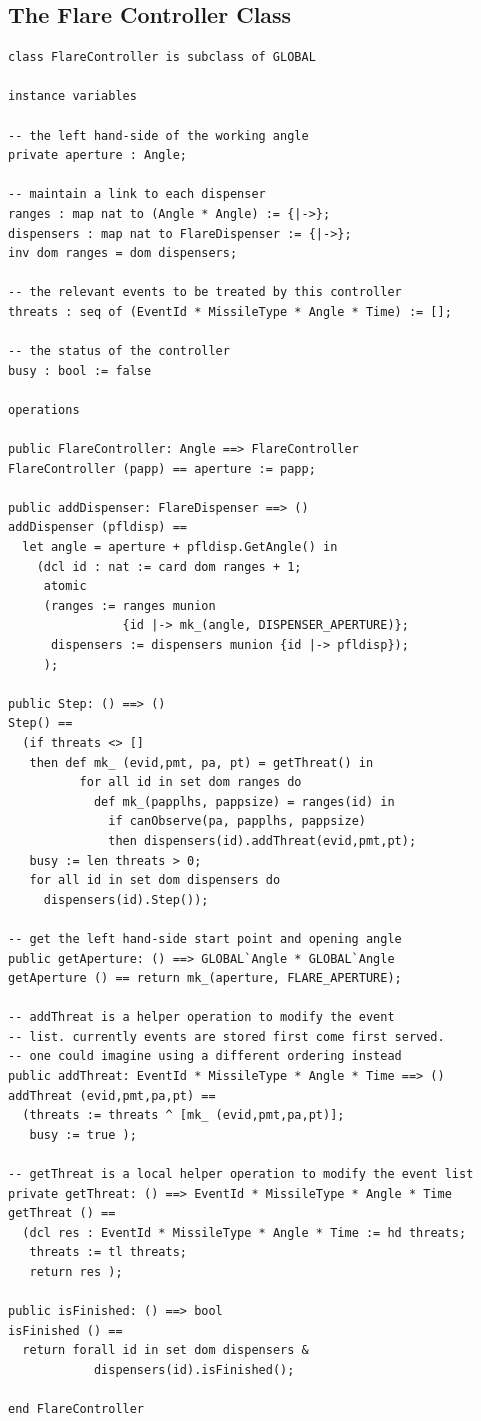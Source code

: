 \documentclass{overturerepchap}
\begin{document}
\subsection{The Flare Controller Class}

\begin{lstlisting}
class FlareController is subclass of GLOBAL

instance variables

-- the left hand-side of the working angle
private aperture : Angle;

-- maintain a link to each dispenser
ranges : map nat to (Angle * Angle) := {|->};
dispensers : map nat to FlareDispenser := {|->};
inv dom ranges = dom dispensers;

-- the relevant events to be treated by this controller
threats : seq of (EventId * MissileType * Angle * Time) := [];

-- the status of the controller
busy : bool := false

operations

public FlareController: Angle ==> FlareController
FlareController (papp) == aperture := papp;

public addDispenser: FlareDispenser ==> ()
addDispenser (pfldisp) ==
  let angle = aperture + pfldisp.GetAngle() in
    (dcl id : nat := card dom ranges + 1;
     atomic
     (ranges := ranges munion 
                {id |-> mk_(angle, DISPENSER_APERTURE)};
      dispensers := dispensers munion {id |-> pfldisp});
     );

public Step: () ==> ()
Step() ==
  (if threats <> []
   then def mk_ (evid,pmt, pa, pt) = getThreat() in
          for all id in set dom ranges do
            def mk_(papplhs, pappsize) = ranges(id) in
              if canObserve(pa, papplhs, pappsize)
              then dispensers(id).addThreat(evid,pmt,pt);
   busy := len threats > 0;
   for all id in set dom dispensers do
     dispensers(id).Step());
 
-- get the left hand-side start point and opening angle
public getAperture: () ==> GLOBAL`Angle * GLOBAL`Angle
getAperture () == return mk_(aperture, FLARE_APERTURE);

-- addThreat is a helper operation to modify the event
-- list. currently events are stored first come first served.
-- one could imagine using a different ordering instead
public addThreat: EventId * MissileType * Angle * Time ==> ()
addThreat (evid,pmt,pa,pt) ==
  (threats := threats ^ [mk_ (evid,pmt,pa,pt)];
   busy := true );

-- getThreat is a local helper operation to modify the event list
private getThreat: () ==> EventId * MissileType * Angle * Time
getThreat () ==
  (dcl res : EventId * MissileType * Angle * Time := hd threats;
   threats := tl threats;
   return res );

public isFinished: () ==> bool
isFinished () ==
  return forall id in set dom dispensers &
            dispensers(id).isFinished();

end FlareController
\end{lstlisting}
\end{document}
